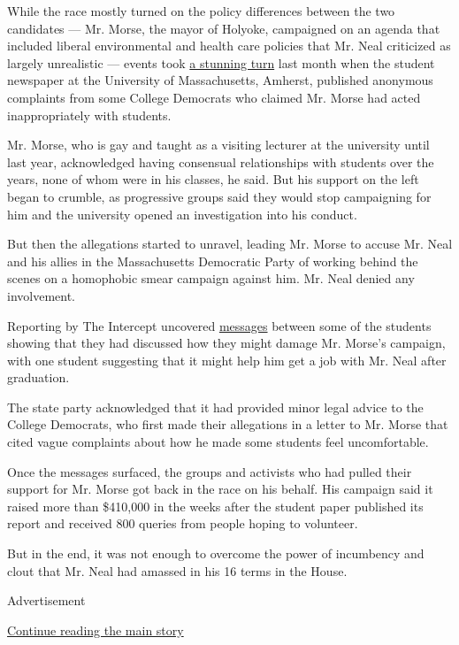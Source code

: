 While the race mostly turned on the policy differences between the two
candidates --- Mr. Morse, the mayor of Holyoke, campaigned on an agenda
that included liberal environmental and health care policies that Mr.
Neal criticized as largely unrealistic --- events took
\href{https://www.nytimes3xbfgragh.onion/2020/08/23/us/politics/alex-morse-massachusetts.html}{a
stunning turn} last month when the student newspaper at the University
of Massachusetts, Amherst, published anonymous complaints from some
College Democrats who claimed Mr. Morse had acted inappropriately with
students.

Mr. Morse, who is gay and taught as a visiting lecturer at the
university until last year, acknowledged having consensual relationships
with students over the years, none of whom were in his classes, he said.
But his support on the left began to crumble, as progressive groups said
they would stop campaigning for him and the university opened an
investigation into his conduct.

But then the allegations started to unravel, leading Mr. Morse to accuse
Mr. Neal and his allies in the Massachusetts Democratic Party of working
behind the scenes on a homophobic smear campaign against him. Mr. Neal
denied any involvement.

Reporting by The Intercept uncovered
\href{https://theintercept.com/2020/08/12/alex-morse-college-democrats-chats/}{messages}
between some of the students showing that they had discussed how they
might damage Mr. Morse's campaign, with one student suggesting that it
might help him get a job with Mr. Neal after graduation.

The state party acknowledged that it had provided minor legal advice to
the College Democrats, who first made their allegations in a letter to
Mr. Morse that cited vague complaints about how he made some students
feel uncomfortable.

Once the messages surfaced, the groups and activists who had pulled
their support for Mr. Morse got back in the race on his behalf. His
campaign said it raised more than \$410,000 in the weeks after the
student paper published its report and received 800 queries from people
hoping to volunteer.

But in the end, it was not enough to overcome the power of incumbency
and clout that Mr. Neal had amassed in his 16 terms in the House.

Advertisement

\protect\hyperlink{after-bottom}{Continue reading the main story}

